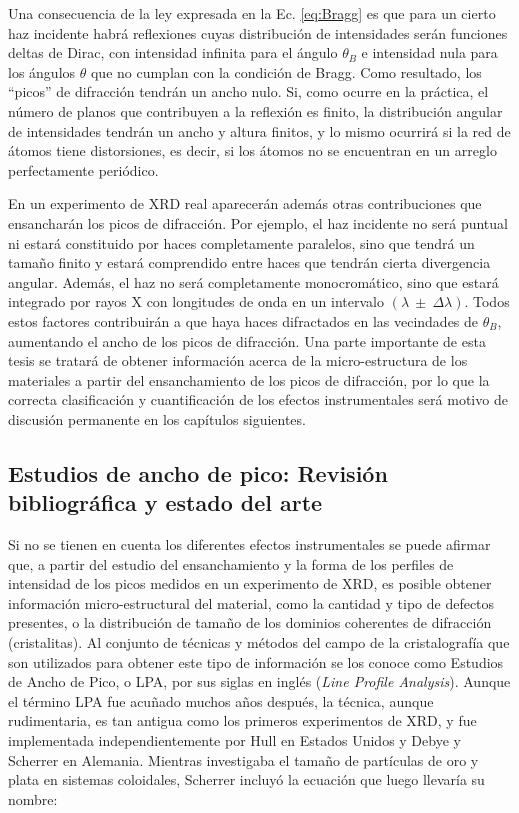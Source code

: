 Una consecuencia de la ley expresada en la Ec. \ref{eq:Bragg} es que para un cierto haz incidente habrá reflexiones cuyas distribución de intensidades serán funciones deltas de Dirac, con intensidad infinita para el ángulo $\theta_{B}$ e intensidad nula para los ángulos $\theta$ que no cumplan con la condición de Bragg. 
Como resultado, los ``picos'' de difracción tendrán un ancho nulo. 
Si, como ocurre en la práctica, el número de planos que contribuyen a la reflexión es finito, la distribución angular de intensidades tendrán un ancho y altura finitos, y lo mismo ocurrirá si la red de átomos tiene distorsiones, es decir, si los átomos no se encuentran en un arreglo perfectamente periódico.

En un experimento de XRD real aparecerán además otras contribuciones que ensancharán los picos de difracción. 
Por ejemplo, el haz incidente no será puntual ni estará constituido por haces completamente paralelos, sino que tendrá un tamaño finito y estará comprendido entre haces que tendrán cierta divergencia angular.
Además, el haz no será completamente monocromático, sino que estará integrado por rayos X con longitudes de onda en un intervalo $(\lambda \ \pm \ \Delta \lambda)$.
Todos estos factores contribuirán a que haya haces difractados en las vecindades de $\theta_{B}$, aumentando el ancho de los picos de difracción. 
Una parte importante de esta tesis se tratará de obtener información acerca de la micro-estructura de los materiales a partir del ensanchamiento de los picos de difracción, por lo que la correcta clasificación y cuantificación de los efectos instrumentales será motivo de discusión permanente en los capítulos siguientes.

\subsection{Estudios de ancho de pico: Revisión bibliográfica y estado del arte}\label{SS:XRD-LPA} 
Si no se tienen en cuenta los diferentes efectos instrumentales se puede afirmar que, a partir del estudio del ensanchamiento y la forma de los perfiles de intensidad de los picos medidos en un experimento de XRD, es posible obtener información micro-estructural del material, como la cantidad y tipo de defectos presentes, o la distribución de tamaño de los dominios coherentes de difracción (cristalitas).
Al conjunto de técnicas y métodos del campo de la cristalografía que son utilizados para obtener este tipo de información se los conoce como Estudios de Ancho de Pico, o LPA, por sus siglas en inglés (\textit{Line Profile Analysis}).
Aunque el término LPA fue acuñado muchos años después, la técnica, aunque rudimentaria, es tan antigua como los primeros experimentos de XRD, y fue implementada independientemente por Hull en Estados Unidos y Debye y Scherrer en Alemania. 
Mientras investigaba el tamaño de partículas de oro y plata en sistemas coloidales, Scherrer incluyó la ecuación que luego llevaría su nombre\cite{Scherrer1918}:

